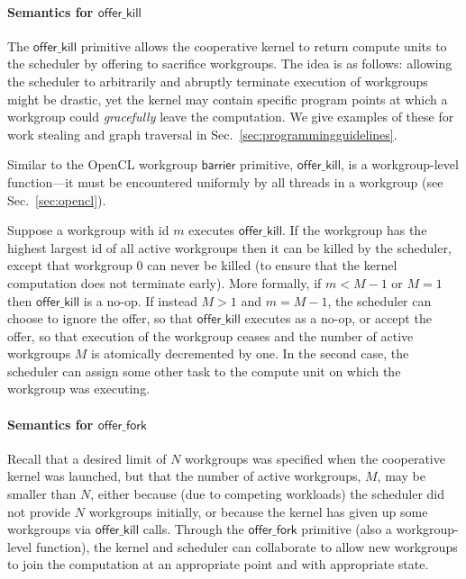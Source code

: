 \documentclass[numbers,nocopyrightspace,10pt]{sigplanconf}
\newcommand{\mysec}{Sec.~}
\newcommand{\offerfork}{\mathsf{offer\_fork}}
\newcommand{\offerkill}{\mathsf{offer\_kill}}
\begin{document}
\paragraph{Semantics for $\offerkill$}

The $\offerkill$ primitive allows the cooperative kernel to return
compute units to the scheduler by offering to sacrifice workgroups.
The idea is as follows: allowing the scheduler to arbitrarily and abruptly terminate execution
of workgroups might be drastic, yet the kernel
may contain specific program points at which a workgroup could
\emph{gracefully} leave the computation.  We give examples of these
for work stealing and graph traversal in \mysec\ref{sec:programmingguidelines}.

Similar to the OpenCL workgroup $\mathsf{barrier}$ primitive,
$\offerkill$, is a workgroup-level function---it must be encountered
uniformly by all threads in a workgroup (see
\mysec\ref{sec:opencl}).

Suppose a workgroup with id $m$ executes $\offerkill$.  
If the workgroup has the highest largest id of all active workgroups then it can be killed by the scheduler, except that workgroup 0 can never be killed (to ensure that the kernel computation does not terminate early).  More formally, if $m < M-1$
or $M=1$ then $\offerkill$ is a no-op.  If instead $M > 1$ and $m =
M-1$, the scheduler can choose to ignore the offer, so that $\offerkill$
executes as a no-op, or accept the offer, so that execution of the workgroup ceases and
the number of active workgroups $M$ is atomically decremented by one.  In the second case, the scheduler can assign some other task to
the compute unit on which the workgroup was executing.


\paragraph{Semantics for $\offerfork$}

Recall that
a desired limit of $N$ workgroups was specified when the cooperative kernel was launched, but that the number of active workgroups, $M$, may be smaller
than $N$, either because (due to competing workloads) the scheduler
did not provide $N$ workgroups initially, or because the kernel has
given up some workgroups via $\offerkill$ calls.  Through the
$\offerfork$ primitive (also a workgroup-level function), the kernel and scheduler can collaborate to allow new
workgroups to join the computation at an appropriate point and with
appropriate state.
\end{document}
